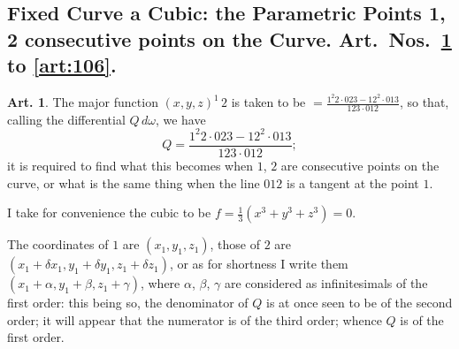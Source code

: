 \documentclass[12pt,a4paper]{article}
\theoremstyle{definition}
\newtheorem{art}{Art.}[section]
\begin{document}
\subsection*{Fixed Curve a Cubic: the Parametric Points 1, 2 consecutive points on the Curve. Art.~Nos.~\ref{art:99} to \ref{art:106}.}

\begin{art}\label{art:99}
The major function $(x, y, z)^1\,2$ is taken to be $= \frac{1^2 2 \cdot 023 - 12^2 \cdot 013}{123 \cdot 012}$, so that, calling the differential $Q\,d\omega$, we have
\[
Q = \frac{1^2 2 \cdot 023 - 12^2 \cdot 013}{123 \cdot 012};
\]
it is required to find what this becomes when $1$, $2$ are consecutive points on the curve, or what is the same thing when the line $012$ is a tangent at the point $1$.

I take for convenience the cubic to be $f = \frac{1}{3}(x^3 + y^3 + z^3) = 0$.

The coordinates of $1$ are $(x_1, y_1, z_1)$, those of $2$ are $(x_1 + \delta x_1, y_1 + \delta y_1, z_1 + \delta z_1)$, or as for shortness I write them $(x_1 + \alpha, y_1 + \beta, z_1 + \gamma)$, where $\alpha$, $\beta$, $\gamma$ are considered as infinitesimals of the first order: this being so, the denominator of $Q$ is at once seen to be of the second order; it will appear that the numerator is of the third order; whence $Q$ is of the first order.
\end{art}
\end{document}
